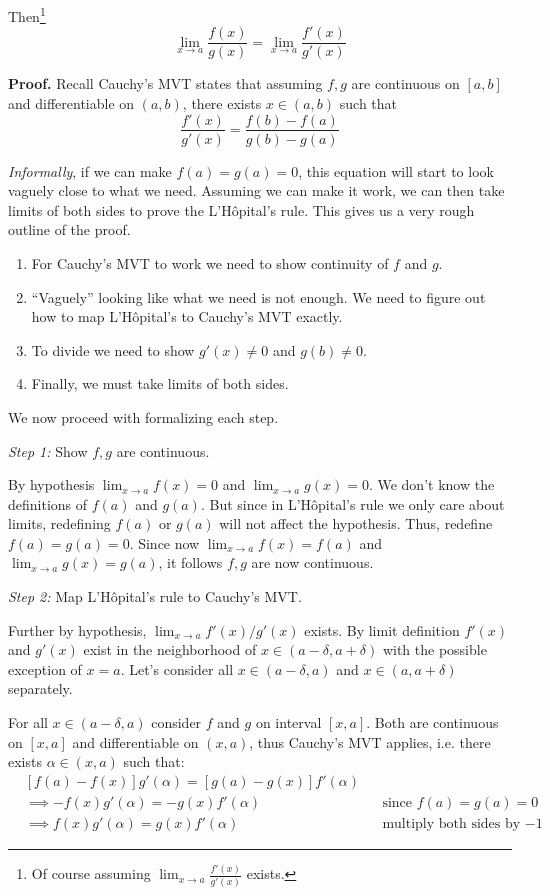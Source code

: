 Then\footnote{Of course assuming $\lim_{x\to a}\frac{f'(x)}{g'(x)}$ exists.}
\[\lim_{x\to a}\frac{f(x)}{g(x)}=\lim_{x\to a}\frac{f'(x)}{g'(x)}\]

\textbf{Proof.} Recall Cauchy's MVT states that assuming $f,g$ are
continuous on $[a,b]$ and differentiable on $(a,b)$, there exists
$x\in(a,b)$ such that
\[\frac{f'(x)}{g'(x)}=\frac{f(b)-f(a)}{g(b)-g(a)}\]

\textit{Informally}, if we can make $f(a)=g(a)=0$, this equation will
start to look vaguely close to what we need. Assuming we can make it
work, we can then take limits of both sides to prove the L'H\^opital's
rule. This gives us a very rough outline of the proof.
\begin{enumerate}
\item For Cauchy's MVT to work we need to show continuity of $f$ and
  $g$.
\item ``Vaguely'' looking like what we need is not enough. We need to
  figure out how to map L'H\^opital's to Cauchy's MVT exactly.
\item To divide we need to show $g'(x)\neq0$ and $g(b)\neq0$.
\item Finally, we must take limits of both sides.
\end{enumerate}

We now proceed with formalizing each step.

\vs

\textit{Step 1:} Show $f,g$ are continuous.

\vs

By hypothesis $\lim_{x\to a}f(x)=0$ and $\lim_{x\to a}g(x)=0$. We don't
know the definitions of $f(a)$ and $g(a)$. But since in L'H\^opital's
rule we only care about limits, redefining $f(a)$ or $g(a)$ will not
affect the hypothesis. Thus, redefine $f(a)=g(a)=0$. Since now
$\lim_{x\to a}f(x)=f(a)$ and $\lim_{x\to a}g(x)=g(a)$, it follows
$f,g$ are now continuous.

\vs

\textit{Step 2:} Map L'H\^opital's rule to Cauchy's MVT.

\vs

Further by hypothesis, $\lim_{x\to a}f'(x)/g'(x)$ exists. By limit
definition $f'(x)$ and $g'(x)$ exist in the neighborhood of
$x\in(a-\delta, a+\delta)$ with the possible exception of $x=a$. Let's consider
all $x\in(a-\delta, a)$ and $x\in(a, a+\delta)$ separately.

\vs

For all $x\in(a-\delta, a)$ consider $f$ and $g$ on interval $[x,a]$. Both
are continuous on $[x,a]$ and differentiable on $(x,a)$, thus Cauchy's
MVT applies, i.e. there exists $\alpha\in(x,a)$ such that:
\begin{align*}
  &[f(a)-f(x)]g'(\alpha)=[g(a)-g(x)]f'(\alpha)\\
  &\implies -f(x)g'(\alpha)=-g(x)f'(\alpha)&&\text{since $f(a)=g(a)=0$}\\
  &\implies f(x)g'(\alpha)=g(x)f'(\alpha)&&\text{multiply both sides by $-1$}
\end{align*}


